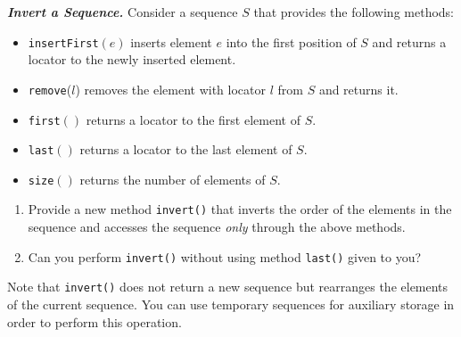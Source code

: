 {\large\bfseries\itshape Invert a Sequence.} 
Consider a sequence $S$ that provides the following methods:
\begin{itemize}
\item[] {\tt insertFirst}$(e)$ inserts element $e$ into the first
  position of $S$ and returns a locator to the newly inserted element.
  
\item[] {\tt remove}($l$) removes the element with locator $l$ from
  $S$ and returns it.
  
\item[] {\tt first}$()$ returns a locator to the first element of $S$.
  
\item[] {\tt last}$()$ returns a locator to the last element of $S$.
  
\item[] {\tt size}$()$ returns the number of elements of $S$.

\end{itemize}

\begin{enumerate}
\item  Provide a new method {\tt invert()} that inverts the order of
  the elements in the sequence and accesses the sequence {\it only}
  through the above methods.
  

\item  Can you perform {\tt invert()} without using method {\tt last()}
  given to you?
\end{enumerate}

Note that {\tt invert()} does not return a new sequence but rearranges
the elements of the current sequence.  You can use temporary sequences
for auxiliary storage in order to perform this operation.

